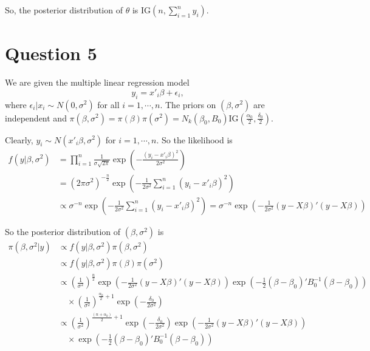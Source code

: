 \documentclass[a4paper]{article}
\begin{document}
So, the posterior distribution of \(\theta\) is \(\text{IG}(n,\sum_{i=1}^{n}y_i)\).

\newpage

\section*{Question 5}
We are given the multiple linear regression model
\[y_i = x'_i\beta + \epsilon_i,\] 
where \(\epsilon_i|x_i\sim N(0,\sigma^2)\) for all \(i=1,\cdots,n\). The priors on \((\beta,\sigma^2)\) are independent and \(\pi(\beta, \sigma^2) = \pi(\beta)\pi(\sigma^2) = N_k(\beta_0,B_0)\text{IG}(\frac{\alpha_0}{2},\frac{\delta_0}{2})\).

\vspace{0.25cm}

Clearly, \(y_i \sim N(x'_i\beta, \sigma^2)\) for \(i = 1, \cdots, n\). So the likelihood is 
\begin{align*}
    f(y|\beta,\sigma^2) &= \prod_{i=1}^{n} \frac{1}{\sigma\sqrt{2\pi}}\exp\left(-\frac{(y_i - x'_i\beta)^2}{2\sigma^2}\right)\\
    &= (2\pi\sigma^2)^{-\frac{n}{2}}\exp\left(-\frac{1}{2\sigma^2}\sum_{i=1}^{n}(y_i - x'_i\beta)^2\right)\\
    &\propto \sigma^{-n}\exp\left(-\frac{1}{2\sigma^2}\sum_{i=1}^{n}(y_i - x'_i\beta)^2\right) = \sigma^{-n}\exp\left(-\frac{1}{2\sigma^2}(y - X\beta)'(y-X\beta)\right)
\end{align*}

So the posterior distribution of \((\beta,\sigma^2)\) is
\begin{align*}
    \pi(\beta,\sigma^2|y) &\propto f(y|\beta,\sigma^2)\pi(\beta,\sigma^2)\\
    &\propto f(y|\beta,\sigma^2)\pi(\beta)\pi(\sigma^2)\\
    &\propto \left(\frac{1}{\sigma^2}\right)^{\frac{n}{2}}\exp\left(-\frac{1}{2\sigma^2}(y - X\beta)'(y-X\beta)\right) \exp\left(-\frac{1}{2}(\beta - \beta_0)'B_0^{-1}(\beta - \beta_0)\right) \\
    &\quad \times \left(\frac{1}{\sigma^2}\right)^{\frac{\alpha_0}{2} + 1}\exp\left(-\frac{\delta_0}{2\sigma^2}\right)\\
    &\propto \left(\frac{1}{\sigma^2}\right)^{\frac{(n+\alpha_0)}{2}+1}\exp\left(-\frac{\delta_0}{2\sigma^2}\right)\exp\left(-\frac{1}{2\sigma^2}(y - X\beta)'(y-X\beta)\right) \\
    & \quad \times \exp\left(-\frac{1}{2}(\beta - \beta_0)'B_0^{-1}(\beta - \beta_0)\right)
\end{align*}
\end{document}
